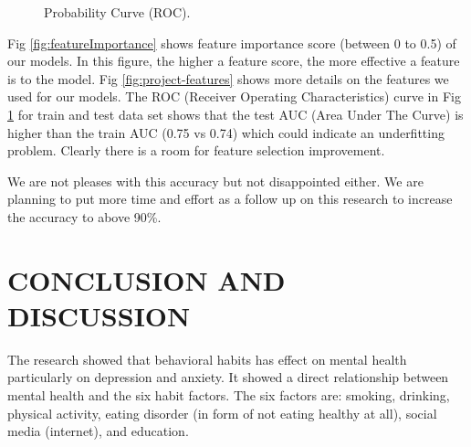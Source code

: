 \documentclass[letterpaper, 10 pt, conference]{ieeeconf}  %
\begin{document}
\begin{figure}[!htb]
        \caption{\label{fig:ROC} Probability Curve (ROC).}
\end{figure}

Fig \ref{fig:featureImportance} shows feature importance score (between 0 to 0.5) of our models. 
In this figure, the higher a feature score, the more effective a feature is to the model. 
Fig \ref{fig:project-features} shows more details on the features we used for our models. 
The ROC (Receiver Operating Characteristics) curve in Fig \ref{fig:ROC} for train and test data set shows that 
the test AUC (Area Under The Curve) is higher than the train AUC (0.75 vs 0.74) which 
could indicate an underfitting problem. Clearly there is a room for feature selection improvement. 


We are not pleases with this accuracy but not disappointed either. We are planning to put more time and effort
as a follow up on this research to increase the accuracy to above 90\%.  


\section{CONCLUSION AND DISCUSSION}
The research showed that behavioral habits has effect on mental health particularly on depression and anxiety. 
It showed a direct relationship between mental health and the six habit factors. The six factors are: 
smoking, drinking, physical activity, eating disorder (in form of not eating healthy at all), social media (internet), and education.
\end{document}
